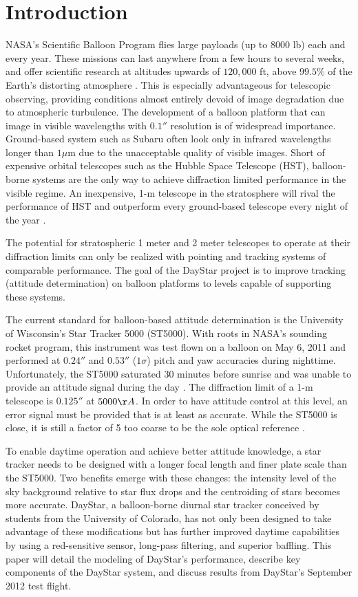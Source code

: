 \documentclass[twocolumn,letterpaper]{IEEEAerospace2012}
\begin{document}
\section{Introduction}
NASA's Scientific Balloon Program flies large payloads (up to 8000 lb) each and every year. These missions can last anywhere from a few hours to several weeks, and offer scientific research at altitudes upwards of $120,000$ ft, above $99.5\%$ of the Earth's distorting atmosphere \cite{young2012}. This is especially advantageous for telescopic observing, providing conditions almost entirely devoid of image degradation due to atmospheric turbulence. The development of a balloon platform that can image in visible wavelengths with $0.1''$ resolution is of widespread importance. Ground-based system such as Subaru often look only in infrared wavelengths longer than $1 \mu$m due to the unacceptable quality of visible images. Short of expensive orbital telescopes such as the Hubble Space Telescope (HST), balloon-borne systems are the only way to achieve diffraction limited performance in the visible regime. An inexpensive, 1-m telescope in the stratosphere will rival the performance of HST and outperform every ground-based telescope every night of
the year \cite{young2012}.

The potential for stratospheric 1 meter and 2 meter telescopes to operate at their diffraction limits can only be realized with pointing and tracking systems of comparable performance. The goal of the DayStar project is to improve tracking (attitude determination) on balloon platforms to levels capable of supporting these systems.

The current standard for balloon-based attitude determination is the University of Wisconsin's Star Tracker 5000 (ST5000). With roots in NASA's sounding rocket program, this instrument was test flown on a balloon on May 6, 2011 and performed at $0.24''$ and $0.53''$ ($1\sigma$) pitch and yaw accuracies during nighttime. Unfortunately, the ST5000 saturated 30 minutes before sunrise and was unable to provide an attitude signal during the day \cite{young2012}. The diffraction limit of a 1-m telescope is $0.125''$ at $5000 \AA{}$. In order to have attitude control at this level, an error signal must be provided that is at least as accurate. While the ST5000 is close, it is still a factor of 5 too coarse to be the sole optical reference \cite{young2012}.

To enable daytime operation and achieve better attitude knowledge, a star tracker needs to be designed with a longer focal length and finer plate scale than the ST5000. Two benefits emerge with these changes: the intensity level of the sky background relative to star flux drops and the centroiding of stars becomes more accurate. DayStar, a balloon-borne diurnal star tracker conceived by students from the University of Colorado, has not only been designed to take advantage of these modifications but has further improved daytime capabilities by using a red-sensitive sensor, long-pass filtering, and superior baffling. This paper will detail the modeling of DayStar's performance, describe key components of the DayStar system, and discuss results from DayStar's September 2012 test flight.
\end{document}
